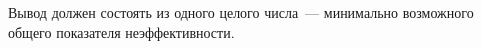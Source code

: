 Вывод должен состоять из одного целого числа~--- минимально возможного общего показателя
неэффективности. 